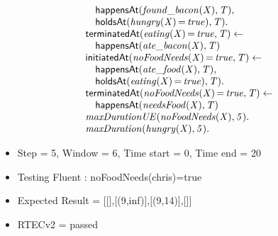 \documentclass[8pt]{beamer}
\DeclareMathOperator{\val}{=}  %
\def \patsize {}
\def\happensAt{\textsf{\patsize happensAt}}
\def\holdsAt{\textsf{\patsize holdsAt}}
\def\initiatedAt{\textsf{\patsize initiatedAt}}
\def\terminatedAt{\textsf{\patsize terminatedAt}}
\newenvironment{mysplit}%
  {\arraycolsep 0pt \begin{array}{l}}%
  {\end{array}}
\begin{document}
\begin{frame}
\begin{minipage}{0.55\linewidth}
\begin{align*}
\begin{mysplit}
                \quad    \happensAt\mathit{(found\_bacon(X),T),}\\
                \quad    \holdsAt\mathit{(hungry(X)\val true),T).}\\
                \terminatedAt\mathit{(eating(X)\val true,T)\leftarrow}\\
                \quad    \happensAt\mathit{(ate\_bacon(X),T)}\\
                \initiatedAt\mathit{(noFoodNeeds(X)\val true,T)\leftarrow}\\
                \quad    \happensAt\mathit{(ate\_food(X),T),}\\
                \quad    \holdsAt\mathit{(eating(X)\val true),T).}\\
                \terminatedAt\mathit{(noFoodNeeds(X)\val true,T)\leftarrow}\\
                \quad    \happensAt\mathit{(needsFood(X),T)}\\
                \mathit{maxDurationUE(noFoodNeeds(X),5).}\\
                \mathit{maxDuration(hungry(X),5).}\\
            \end{mysplit}
        \end{align*}
    \end{minipage}
    \begin{itemize}
        \item  Step = 5, Window = 6, Time start = 0, Time  end = 20
        \item Testing Fluent :  noFoodNeeds(chris)=true
        \item Expected Result = [[],[(9,inf)],[(9,14)],[]]
        \item RTECv2 = passed
    \end{itemize}
\end{frame}
\end{document}
